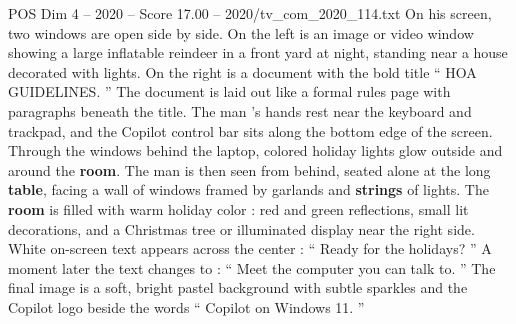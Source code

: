 \begin{textsample}{POS Dim 4 – 2020 – Score 17.00 – 2020/tv\_com\_2020\_114.txt}
On his screen, two windows are open side by side.
On the left is an image or video window showing a large inflatable reindeer in a front yard at night, standing near a house decorated with lights.
On the right is a document with the bold title “ HOA GUIDELINES. ” The document is laid out like a formal rules page with paragraphs beneath the title.
The man ’s hands rest near the keyboard and trackpad, and the Copilot control bar sits along the bottom edge of the screen.
Through the windows behind the laptop, colored holiday lights glow outside and around the \textbf{room}.
The man is then seen from behind, seated alone at the long \textbf{table}, facing a wall of windows framed by garlands and \textbf{strings} of lights.
The \textbf{room} is filled with warm holiday color : red and green reflections, small lit decorations, and a Christmas tree or illuminated display near the right side.
White on-screen text appears across the center : “ Ready for the holidays? ” A moment later the text changes to : “ Meet the computer you can talk to. ” The final image is a soft, bright pastel background with subtle sparkles and the Copilot logo beside the words “ Copilot on Windows 11. ”

\end{textsample}
